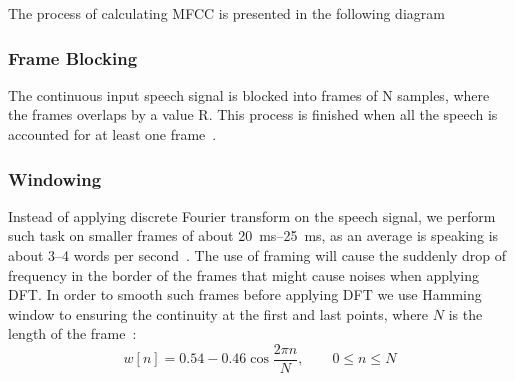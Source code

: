 \documentclass[a4paper,12pt]{article}
\begin{document}
The process of calculating MFCC is presented
in the following diagram~\cite{mfcproc}
\begin{center}
\end{center}


\subsubsection{Frame Blocking}
The continuous input speech signal is blocked into frames of N samples, where
the frames overlaps by a value R.  This process is finished when all the speech
is accounted for at least one frame~\cite{do}.

\subsubsection{Windowing}
Instead of applying discrete Fourier transform on the speech signal, we perform
such task on smaller frames of about \SIrange{20}{25}{\milli\second}, as an
average is speaking is about \numrange{3}{4} words per second~\cite{rate}.
The use of framing will cause the suddenly drop of frequency in the border of
the frames that might cause noises when applying DFT.  In order to smooth such
frames before applying DFT we use Hamming window to ensuring the continuity at
the first and last points, where $N$ is the length of the frame~\cite{hamming}:
\[w[n] = 0.54 - 0.46\cos\frac{2\pi n}{N},\qquad 0 \le n \le N\]
\end{document}
